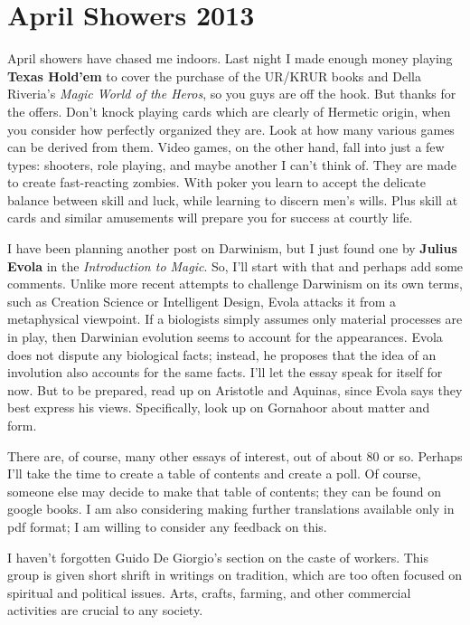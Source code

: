 \section{April Showers 2013}

April showers have chased me indoors. Last night I made enough money playing \textbf{Texas Hold'em} to cover the purchase of the UR/KRUR books and Della Riveria's \emph{Magic World of the Heros}, so you guys are off the hook. But thanks for the offers. Don't knock playing cards which are clearly of Hermetic origin, when you consider how perfectly organized they are. Look at how many various games can be derived from them. Video games, on the other hand, fall into just a few types: shooters, role playing, and maybe another I can't think of. They are made to create fast-reacting zombies. With poker you learn to accept the delicate balance between skill and luck, while learning to discern men's wills. Plus skill at cards and similar amusements will prepare you for success at courtly life.

I have been planning another post on Darwinism, but I just found one by \textbf{Julius Evola} in the \emph{Introduction to Magic}. So, I'll start with that and perhaps add some comments. Unlike more recent attempts to challenge Darwinism on its own terms, such as Creation Science or Intelligent Design, Evola attacks it from a metaphysical viewpoint. If a biologists simply assumes only material processes are in play, then Darwinian evolution seems to account for the appearances. Evola does not dispute any biological facts; instead, he proposes that the idea of an involution also accounts for the same facts. I'll let the essay speak for itself for now. But to be prepared, read up on Aristotle and Aquinas, since Evola says they best express his views. Specifically, look up on Gornahoor about matter and form.

There are, of course, many other essays of interest, out of about 80 or so. Perhaps I'll take the time to create a table of contents and create a poll. Of course, someone else may decide to make that table of contents; they can be found on google books. I am also considering making further translations available only in pdf format; I am willing to consider any feedback on this.

I haven't forgotten Guido De Giorgio's section on the caste of workers. This group is given short shrift in writings on tradition, which are too often focused on spiritual and political issues. Arts, crafts, farming, and other commercial activities are crucial to any society.


